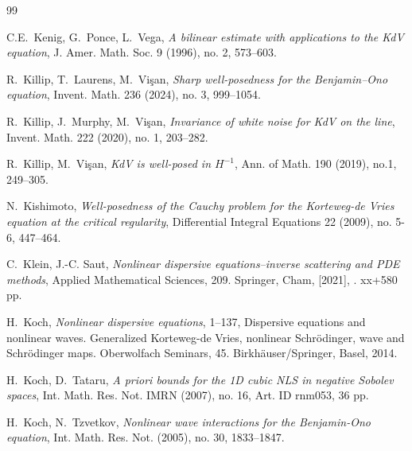 \documentclass[letterpaper, 11pt,  reqno]{amsart}
\newcommand{\1}{\hspace{0.5mm}\text{I}\hspace{0.5mm}}
\numberwithin{equation}{section}
\numberwithin{theorem}{section}
\begin{document}
\begin{thebibliography}{99}
%
%
%




C.E.~Kenig, G.~Ponce, L.~Vega,
{\it A bilinear estimate with applications to the KdV equation},
J. Amer. Math. Soc. 9 (1996), no. 2, 573--603.






R.~Killip, T.~Laurens, M.~Vi\c{s}an, 
{\it Sharp well-posedness for the Benjamin--Ono equation}, 
Invent. Math. 236 (2024), no. 3, 999--1054.



R.~Killip, J.~Murphy,  M.~Vi\c{s}an, 
{\it  Invariance of white noise for KdV on the line}, Invent. Math. 222 (2020), no. 1, 203--282.


R.~Killip, M.~Vi\c{s}an, 
{\it KdV is well-posed in $H^{-1}$}, 
Ann. of Math. 190 (2019), no.1, 249--305.


N.~Kishimoto,
{\it Well-posedness of the Cauchy problem for the Korteweg-de Vries equation at the critical regularity},
Differential Integral Equations 22 (2009), no. 5-6, 447--464.


C.~Klein, J.-C. Saut, 
{\it Nonlinear dispersive equations--inverse scattering and PDE methods}, 
Applied Mathematical Sciences, 209. Springer, Cham, [2021], . xx+580 pp.



H.~Koch, 
{\it Nonlinear dispersive equations}, 1--137, 
Dispersive equations and nonlinear waves. Generalized Korteweg-de Vries, nonlinear Schr\"odinger, wave and Schr\"odinger maps. Oberwolfach Seminars, 45. Birkh\"auser/Springer, Basel, 2014. 

H.~Koch, D.~Tataru, 
{\it A priori bounds for the 1D cubic NLS in negative Sobolev spaces}, 
Int. Math. Res. Not. IMRN (2007), no. 16, Art. ID rnm053, 36 pp. 
 
 
H.~Koch, N.~Tzvetkov, 
{\it Nonlinear wave interactions for the Benjamin-Ono equation},
Int. Math. Res. Not. (2005), no. 30, 1833--1847. 
%
%
% 
%
 

\end{thebibliography}
\end{document}
